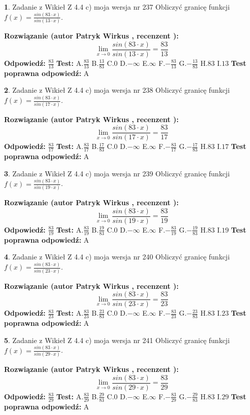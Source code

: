 \documentclass[12pt, a4paper]{article}
\theoremstyle{definition} %
\newtheorem{zad}{}
\newcommand{\zadStart}[1]{\begin{zad}#1\newline}
\newcommand{\zadStop}{\end{zad}}
\newcommand{\rozwStart}[2]{\noindent \textbf{Rozwiązanie (autor #1 , recenzent #2): }\newline}
\newcommand{\rozwStop}{\newline}
\newcommand{\odpStart}{\noindent \textbf{Odpowiedź:}\newline}
\newcommand{\odpStop}{\newline}
\newcommand{\testStart}{\noindent \textbf{Test:}\newline}
\newcommand{\testStop}{\newline}
\newcommand{\kluczStart}{\noindent \textbf{Test poprawna odpowiedź:}\newline}
\newcommand{\kluczStop}{\newline}
\begin{document}
\zadStart{Zadanie z Wikieł Z 4.4 c) moja wersja nr 237}
Obliczyć granicę funkcji $f(x)=\frac{sin(83\cdot x)}{sin(13\cdot x)}$.
\zadStop
\rozwStart{Patryk Wirkus}{}
$$\lim\limits_{x\to 0}\frac{sin(83\cdot x)}{sin(13\cdot x)}=
\frac{83}{13}$$
\rozwStop
\odpStart
$\frac{83}{13}$
\odpStop
\testStart
A.$\frac{83}{13}$
B.$\frac{13}{83}$
C.$0$
D.$-\infty$
E.$\infty$
F.$-\frac{83}{13}$
G.$-\frac{13}{83}$
H.$83$
I.$13$
\testStop
\kluczStart
A
\kluczStop



\zadStart{Zadanie z Wikieł Z 4.4 c) moja wersja nr 238}
Obliczyć granicę funkcji $f(x)=\frac{sin(83\cdot x)}{sin(17\cdot x)}$.
\zadStop
\rozwStart{Patryk Wirkus}{}
$$\lim\limits_{x\to 0}\frac{sin(83\cdot x)}{sin(17\cdot x)}=
\frac{83}{17}$$
\rozwStop
\odpStart
$\frac{83}{17}$
\odpStop
\testStart
A.$\frac{83}{17}$
B.$\frac{17}{83}$
C.$0$
D.$-\infty$
E.$\infty$
F.$-\frac{83}{17}$
G.$-\frac{17}{83}$
H.$83$
I.$17$
\testStop
\kluczStart
A
\kluczStop



\zadStart{Zadanie z Wikieł Z 4.4 c) moja wersja nr 239}
Obliczyć granicę funkcji $f(x)=\frac{sin(83\cdot x)}{sin(19\cdot x)}$.
\zadStop
\rozwStart{Patryk Wirkus}{}
$$\lim\limits_{x\to 0}\frac{sin(83\cdot x)}{sin(19\cdot x)}=
\frac{83}{19}$$
\rozwStop
\odpStart
$\frac{83}{19}$
\odpStop
\testStart
A.$\frac{83}{19}$
B.$\frac{19}{83}$
C.$0$
D.$-\infty$
E.$\infty$
F.$-\frac{83}{19}$
G.$-\frac{19}{83}$
H.$83$
I.$19$
\testStop
\kluczStart
A
\kluczStop



\zadStart{Zadanie z Wikieł Z 4.4 c) moja wersja nr 240}
Obliczyć granicę funkcji $f(x)=\frac{sin(83\cdot x)}{sin(23\cdot x)}$.
\zadStop
\rozwStart{Patryk Wirkus}{}
$$\lim\limits_{x\to 0}\frac{sin(83\cdot x)}{sin(23\cdot x)}=
\frac{83}{23}$$
\rozwStop
\odpStart
$\frac{83}{23}$
\odpStop
\testStart
A.$\frac{83}{23}$
B.$\frac{23}{83}$
C.$0$
D.$-\infty$
E.$\infty$
F.$-\frac{83}{23}$
G.$-\frac{23}{83}$
H.$83$
I.$23$
\testStop
\kluczStart
A
\kluczStop



\zadStart{Zadanie z Wikieł Z 4.4 c) moja wersja nr 241}
Obliczyć granicę funkcji $f(x)=\frac{sin(83\cdot x)}{sin(29\cdot x)}$.
\zadStop
\rozwStart{Patryk Wirkus}{}
$$\lim\limits_{x\to 0}\frac{sin(83\cdot x)}{sin(29\cdot x)}=
\frac{83}{29}$$
\rozwStop
\odpStart
$\frac{83}{29}$
\odpStop
\testStart
A.$\frac{83}{29}$
B.$\frac{29}{83}$
C.$0$
D.$-\infty$
E.$\infty$
F.$-\frac{83}{29}$
G.$-\frac{29}{83}$
H.$83$
I.$29$
\testStop
\kluczStart
A
\kluczStop
\end{document}
